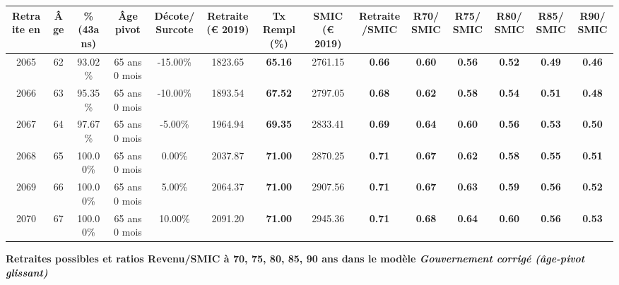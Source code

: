 \begin{adjustbox}{max width=\textwidth} 
\begin{tabular}[htb]{|c|c||c|c|c||c|c||c|c||c|c|c|c|c|} 
\hline 
 Retraite en &  Âge &  \%(43ans) &  Âge pivot &  Décote/Surcote &  Retraite (\euro{} 2019) &  Tx Rempl(\%) &  SMIC (\euro{} 2019) &  Retraite/SMIC &  R70/SMIC &  R75/SMIC &  R80/SMIC &  R85/SMIC &  R90/SMIC \\ 
\hline \hline 
 2065 &  62 &  93.02\% &  65 ans 0 mois &  -15.00\% &  1823.65 &  {\bf 65.16} &  2761.15 &  {\bf {\color{red} 0.66}} &  {\bf {\color{red} 0.60}} &  {\bf {\color{red} 0.56}} &  {\bf {\color{red} 0.52}} &  {\bf {\color{red} 0.49}} &  {\bf {\color{red} 0.46}} \\ 
\hline 
 2066 &  63 &  95.35\% &  65 ans 0 mois &  -10.00\% &  1893.54 &  {\bf 67.52} &  2797.05 &  {\bf {\color{red} 0.68}} &  {\bf {\color{red} 0.62}} &  {\bf {\color{red} 0.58}} &  {\bf {\color{red} 0.54}} &  {\bf {\color{red} 0.51}} &  {\bf {\color{red} 0.48}} \\ 
\hline 
 2067 &  64 &  97.67\% &  65 ans 0 mois &  -5.00\% &  1964.94 &  {\bf 69.35} &  2833.41 &  {\bf {\color{red} 0.69}} &  {\bf {\color{red} 0.64}} &  {\bf {\color{red} 0.60}} &  {\bf {\color{red} 0.56}} &  {\bf {\color{red} 0.53}} &  {\bf {\color{red} 0.50}} \\ 
\hline 
 2068 &  65 &  100.00\% &  65 ans 0 mois &  0.00\% &  2037.87 &  {\bf 71.00} &  2870.25 &  {\bf {\color{red} 0.71}} &  {\bf {\color{red} 0.67}} &  {\bf {\color{red} 0.62}} &  {\bf {\color{red} 0.58}} &  {\bf {\color{red} 0.55}} &  {\bf {\color{red} 0.51}} \\ 
\hline 
 2069 &  66 &  100.00\% &  65 ans 0 mois &  5.00\% &  2064.37 &  {\bf 71.00} &  2907.56 &  {\bf {\color{red} 0.71}} &  {\bf {\color{red} 0.67}} &  {\bf {\color{red} 0.63}} &  {\bf {\color{red} 0.59}} &  {\bf {\color{red} 0.56}} &  {\bf {\color{red} 0.52}} \\ 
\hline 
 2070 &  67 &  100.00\% &  65 ans 0 mois &  10.00\% &  2091.20 &  {\bf 71.00} &  2945.36 &  {\bf {\color{red} 0.71}} &  {\bf {\color{red} 0.68}} &  {\bf {\color{red} 0.64}} &  {\bf {\color{red} 0.60}} &  {\bf {\color{red} 0.56}} &  {\bf {\color{red} 0.53}} \\ 
\hline 
\hline 
\end{tabular} 
\end{adjustbox} 
 
 \vspace{0.1cm} 
{\bf \noindent Retraites possibles et ratios Revenu/SMIC à 70, 75, 80, 85, 90 ans dans le modèle \emph{Gouvernement corrigé (âge-pivot glissant)}}  
 
